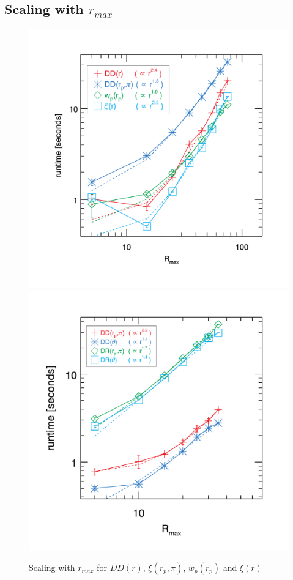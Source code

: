 \documentclass[preprint, 12pt, authoryear]{elsarticle}
\newcommand{\rmax}{\ensuremath{{r_{max}}}\xspace}
\newcommand{\xir}{\ensuremath{{DD(r)}}\xspace}
\newcommand{\xiofr}{\ensuremath{{\xi(r)}}\xspace}
\newcommand{\wprp}{\ensuremath{{w_p(r_p)}}\xspace}
\newcommand{\xirppi}{\ensuremath{{\xi(r_p,\pi)}}\xspace}
\begin{document}
\subsection{Scaling with \rmax}
\begin{figure}[htbp]
\includegraphics[clip=true,width=0.5\linewidth]{timings_Mr19_rmax}%
\includegraphics[clip=true,width=0.5\linewidth]{timings_Mr19_mocks_rmax}
\caption{Scaling with \rmax for \xir, \xirppi, \wprp and \xiofr}
\label{fig:scaling_rmax}
\end{figure}
\end{document}
